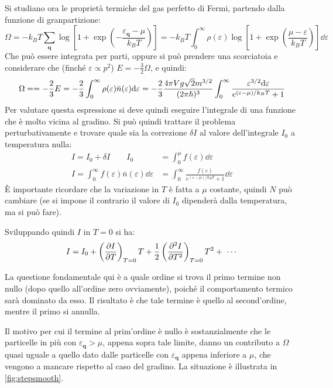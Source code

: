 Si studiano ora le proprietà termiche del gas perfetto di Fermi, partendo dalla funzione di granpartizione:
\begin{equation*}
\Omega = - k_B T \sum_{\textbf{q}} \log \left[1 + \exp \left(-\frac{\varepsilon_{\textbf{q}} - \mu}{k_B T}\right)\right] = - k_B T \int_{0}^{\infty} \rho(\varepsilon)\log \left[1 + \exp \left(\frac{\mu - \varepsilon}{k_B T}\right)\right] \dd \varepsilon
\end{equation*}
Che può essere integrata per parti, oppure si può prendere una scorciatoia e considerare che (finché $\varepsilon \propto p^2$) $E = -\frac{3}{2} \Omega$, e quindi:
\begin{equation*}
\Omega = =  -\frac{2}{3} E = -\frac{2}{3} \int_{0}^{\infty} \rho(\varepsilon)\bar{n}(\varepsilon)\dd \varepsilon = - \frac{2}{3} \frac{4\pi V g \sqrt{2} m^{3/2}}{(2\pi \hbar)^3} \int_{0}^{\infty}\frac{\varepsilon^{3/2} \dd \varepsilon}{e^{(\varepsilon - \mu)/k_BT} +1}
\end{equation*}
Per valutare questa espressione si deve quindi eseguire l'integrale di una funzione che è molto vicina al gradino.
Si può quindi trattare il problema perturbativamente e trovare quale sia la correzione $\delta I$ al valore dell'integrale $I_0$ a temperatura nulla:
\begin{align*}
I = I_0 + \delta I \qquad I_0 &= \int_{0}^{\mu} f(\varepsilon) \dd \varepsilon\\
I= \int_{0}^{\infty} f(\varepsilon) \bar{n}(\varepsilon) \dd \varepsilon &= \int_{0}^{\infty}  \frac{f(\varepsilon)}{e^{(\varepsilon - \mu)/k_BT} +1} \dd \varepsilon
\end{align*}
\`E importante ricordare che la variazione in $T$ è fatta a $\mu$ costante, quindi $N$ può cambiare (se si impone il contrario il valore di $I_0$ dipenderà dalla temperatura, ma si può fare).

Sviluppando quindi $I$ in $T=0$ si ha:
\begin{equation*}
I = I_0 + \left(\frac{\partial {I}}{\partial {T}}\right)_{T=0} T + \frac{1}{2} \left(\frac{\partial {^2 I}}{\partial {T^2}}\right)_{T=0} T^2 + ~\cdots
\end{equation*}

La questione fondamentale qui è a quale ordine si trova il primo termine non nullo (dopo quello all'ordine zero ovviamente), poiché il comportamento termico sarà dominato da esso. Il risultato è che tale termine è quello al second'ordine, mentre il primo si annulla.

Il motivo per cui il termine al prim'ordine è nullo è sostanzialmente che le particelle in più con $\varepsilon_{\textbf{q}} > \mu$, appena sopra tale limite, danno un contributo a $\Omega$ quasi uguale a quello dato dalle particelle con $\varepsilon_{\textbf{q}}$ appena inferiore a $\mu$, che vengono a mancare rispetto al caso del gradino. La situazione è illustrata in \cref{fig:stepsmooth}.

